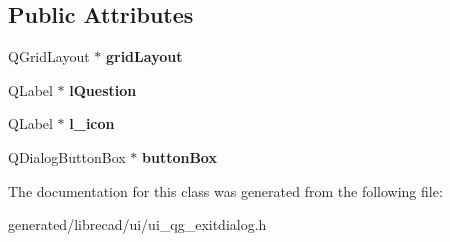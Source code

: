 \subsection*{Public Attributes}
\begin{DoxyCompactItemize}
\item 
\hypertarget{classUi__QG__ExitDialog_aaed90e2f617beecdc8078dca2b3bc569}{Q\-Grid\-Layout $\ast$ {\bfseries grid\-Layout}}\label{classUi__QG__ExitDialog_aaed90e2f617beecdc8078dca2b3bc569}

\item 
\hypertarget{classUi__QG__ExitDialog_a56fd9ef838dbcbd6ec05c1716a21c4d0}{Q\-Label $\ast$ {\bfseries l\-Question}}\label{classUi__QG__ExitDialog_a56fd9ef838dbcbd6ec05c1716a21c4d0}

\item 
\hypertarget{classUi__QG__ExitDialog_ad089f0b9cdd69d5e01065fefd3d1756f}{Q\-Label $\ast$ {\bfseries l\-\_\-icon}}\label{classUi__QG__ExitDialog_ad089f0b9cdd69d5e01065fefd3d1756f}

\item 
\hypertarget{classUi__QG__ExitDialog_a64d60a7a8a651f6e0a649f62277e2fc3}{Q\-Dialog\-Button\-Box $\ast$ {\bfseries button\-Box}}\label{classUi__QG__ExitDialog_a64d60a7a8a651f6e0a649f62277e2fc3}

\end{DoxyCompactItemize}


The documentation for this class was generated from the following file\-:\begin{DoxyCompactItemize}
\item 
generated/librecad/ui/ui\-\_\-qg\-\_\-exitdialog.\-h\end{DoxyCompactItemize}

